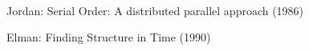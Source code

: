 \documentclass[10pt, a4paper,spanish]{article}
\begin{document}
		\paragraph{}

  \begin{thebibliography}{9}

    	Jordan: Serial Order: A distributed parallel approach (1986)

    	Elman: Finding Structure in Time (1990)

	\end{thebibliography}
\end{document}
